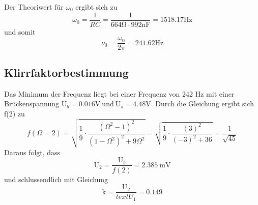 Der Theoriwert für $\omega_0$ ergibt sich zu
\begin{equation*}
  \omega_0 = \frac{1}{RC} = \frac{1}{664\si{\ohm } \cdot 992\si{\nano\farad}}
  = 1518.17 \si{\hertz}
\end{equation*}
und somit
\begin{equation*}
  \nu_0 = \frac{\omega_0}{2\pi} = 241.62 \si{\hertz}
\end{equation*}

\subsection{Klirrfaktorbestimmung}

Das Minimum der Frequenz liegt bei einer Frequenz von 242 $\si{\hertz}$
mit einer Brückenspannung $\text{U}_b = 0.016 \si{\volt} \: \text{und} \:
\text{U}_s = 4.48 \si{\volt} $.
Durch die Gleichung %
ergibt sich f(2) zu
\begin{equation*}
  f(\Omega =2) = \sqrt{\frac{1}{9} \cdot \frac{\left(\Omega^2-1\right)^2}{\left(1-\Omega^2
  \right)^2+9\Omega^2}} = \sqrt{\frac{1}{9} \cdot \frac{(3)^2}{(-3)^2+36}} =
  \frac{1}{\sqrt{45}}
\end{equation*}
Daraus folgt, dass
\begin{equation*}
  \text{U}_2 = \frac{\text{U}_b}{f(2)} = \SI{2.385}{\milli\volt}
\end{equation*}
und schlussendlich mit Gleichung %
\begin{equation*}
  \text{k}= \frac{\text{U}_2}{text{U}_1} = 0.149
\end{equation*}
